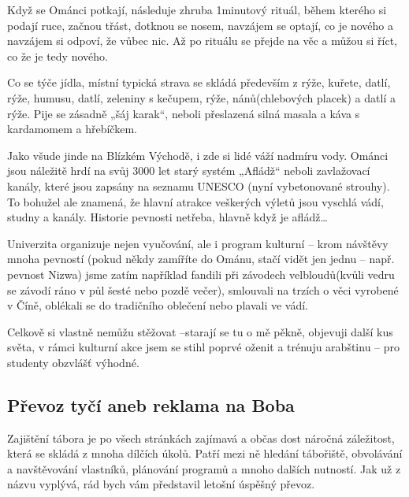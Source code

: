 Když se Ománci potkají, následuje zhruba 1minutový rituál, během kterého si podají ruce, začnou třást, dotknou se nosem, navzájem se optají, co je nového a navzájem si odpoví, že vůbec nic. Až po rituálu se přejde na věc a můžou si říct, co že je tedy nového. 

Co se týče jídla, místní typická strava se skládá především z rýže, kuřete, datlí, rýže, humusu, datlí, zeleniny s kečupem, rýže, nánů(chlebových placek) a datlí a rýže. Pije se zásadně „šáj karak“, neboli přeslazená silná masala a káva s kardamomem a hřebíčkem. 

Jako všude jinde na Blízkém Východě, i zde si lidé váží nadmíru vody. Ománci jsou náležitě hrdí na svůj 3000 let starý systém „Afládž“ neboli zavlažovací kanály, které jsou zapsány na seznamu UNESCO (nyní vybetonované strouhy). To bohužel ale znamená, že hlavní atrakce veškerých výletů jsou vyschlá vádí, studny a kanály. Historie pevnosti netřeba, hlavně když je afládž…

Univerzita organizuje nejen vyučování, ale i program kulturní – krom návštěvy mnoha pevností (pokud někdy zamíříte do Ománu, stačí vidět jen jednu – např. pevnost Nizwa) jsme zatím například fandili při závodech velbloudů(kvůli vedru se závodí ráno v půl šesté nebo pozdě večer), smlouvali na trzích o věci vyrobené v Číně, oblékali se do tradičního oblečení nebo plavali ve vádí. 

Celkově si vlastně nemůžu stěžovat –starají se tu o mě pěkně, objevuji další kus světa, v rámci kulturní akce jsem se stihl poprvé oženit a trénuju arabštinu – pro studenty obzvlášť výhodné. 



\subsection*{Převoz tyčí aneb reklama na Boba}
\label{sub:převoz_tyčí_aneb_reklama_na_Boba}

Zajištění tábora je po všech stránkách zajímavá a občas dost náročná záležitost, která se skládá z mnoha dílčích úkolů. Patří mezi ně hledání tábořiště, obvolávání a navštěvování vlastníků, plánování programů a mnoho dalších nutností. Jak už z názvu vyplývá, rád bych vám představil letošní úspěšný převoz.

